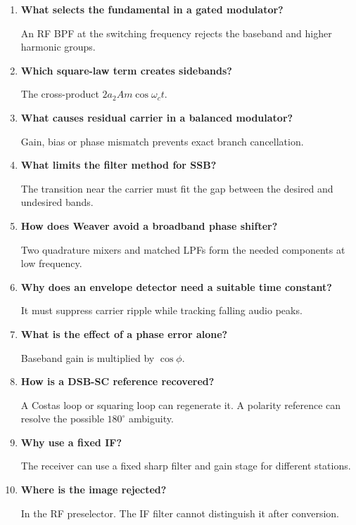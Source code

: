 \documentclass[12pt,a4paper]{article}
\newcommand{\Q}[1]{\textbf{#1}\par\noindent\ignorespaces}
\begin{document}
\begin{tcolorbox}[exambox, title={Frequently Asked / Viva Questions}]
\begin{enumerate}[topsep=0pt, label=\textbf{Q\arabic*.}, itemsep=5pt]
  \item \Q{What selects the fundamental in a gated modulator?}
    An RF BPF at the switching frequency rejects the baseband and higher harmonic groups.
  \item \Q{Which square-law term creates sidebands?}
    The cross-product $2a_2Am\cos\omega_ct$.
  \item \Q{What causes residual carrier in a balanced modulator?}
    Gain, bias or phase mismatch prevents exact branch cancellation.
  \item \Q{What limits the filter method for SSB?}
    The transition near the carrier must fit the gap between the desired and undesired bands.
  \item \Q{How does Weaver avoid a broadband phase shifter?}
    Two quadrature mixers and matched LPFs form the needed components at low frequency.
  \item \Q{Why does an envelope detector need a suitable time constant?}
    It must suppress carrier ripple while tracking falling audio peaks.
  \item \Q{What is the effect of a phase error alone?}
    Baseband gain is multiplied by $\cos\phi$.
  \item \Q{How is a DSB-SC reference recovered?}
    A Costas loop or squaring loop can regenerate it. A polarity reference can resolve the possible $180^\circ$ ambiguity.
  \item \Q{Why use a fixed IF?}
    The receiver can use a fixed sharp filter and gain stage for different stations.
  \item \Q{Where is the image rejected?}
    In the RF preselector. The IF filter cannot distinguish it after conversion.
\end{enumerate}
\end{tcolorbox}
\end{document}
